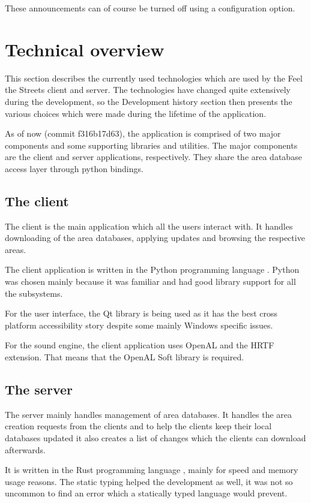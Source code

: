 \documentclass[nolof,digital]{fithesis3}
\begin{document}
These announcements can of course be turned off using a configuration option.
\section{Technical overview}
This section describes the currently used technologies which are used by the Feel the Streets client and server. The technologies have changed quite extensively during the development, so the Development history section then presents the various choices which were made during the lifetime of the application.

As of now (commit f316b17d63), the application is comprised of two major components and some supporting libraries and utilities. The major components are the client and server applications, respectively. They share the area database access layer through python bindings.
\subsection{The client}
The client is the main application which all the users interact with. It handles downloading of the area databases, applying updates and browsing the respective areas.

The client application is written in the Python programming language \parencite{python}. Python was chosen mainly because it was familiar and had good library support for all the subsystems.

For the user interface, the Qt library \parencite{qt} is being used as it has the best cross platform accessibility story despite some mainly Windows specific issues.

For the sound engine, the client application uses OpenAL and the HRTF extension. That means that the OpenAL Soft library \parencite{openalsoft} is required.
\subsection{The server}
The server mainly handles management of area databases. It handles the area creation requests from the clients and to help the clients keep their local databases updated it also creates a list of changes which the clients can download afterwards.

It is written in the Rust programming language \parencite{rust}, mainly for speed and memory usage reasons. The static typing helped the development as well, it was not so uncommon to find an error which a statically typed language would prevent.
\end{document}
